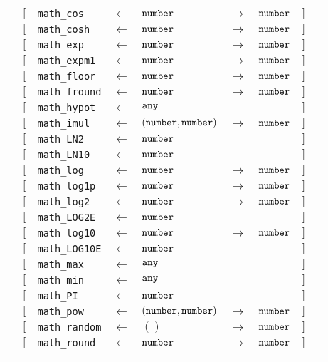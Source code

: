 \begin{tabular}[fragile]{lllllllll}
& $[$ & \texttt{math\_cos} & $\leftarrow$  & $\texttt{number}$ & $\rightarrow$ & $\texttt{number}$ & $]$ \\
& $[$ & \texttt{math\_cosh} & $\leftarrow$  & $\texttt{number}$ & $\rightarrow$ & $\texttt{number}$ & $]$ \\
& $[$ & \texttt{math\_exp} & $\leftarrow$  & $\texttt{number}$ & $\rightarrow$ & $\texttt{number}$ & $]$ \\
& $[$ & \texttt{math\_expm1} & $\leftarrow$  & $\texttt{number}$ & $\rightarrow$ & $\texttt{number}$ & $]$ \\
& $[$ & \texttt{math\_floor} & $\leftarrow$  & $\texttt{number}$ & $\rightarrow$ & $\texttt{number}$ & $]$ \\
& $[$ & \texttt{math\_fround} & $\leftarrow$  & $\texttt{number}$ & $\rightarrow$ & $\texttt{number}$ & $]$ \\
& $[$ & \texttt{math\_hypot} & $\leftarrow$  & $\texttt{any}$ & & & $]$ \\
& $[$ & \texttt{math\_imul} & $\leftarrow$  & $(\texttt{number}, \texttt{number})$ & $\rightarrow$ & $\texttt{number}$ & $]$ \\
& $[$ & \texttt{math\_LN2} & $\leftarrow$  & $\texttt{number}$ & & & $]$ \\
& $[$ & \texttt{math\_LN10} & $\leftarrow$  & $\texttt{number}$ & & & $]$ \\
& $[$ & \texttt{math\_log} & $\leftarrow$  & $\texttt{number}$ & $\rightarrow$ & $\texttt{number}$ & $]$ \\
& $[$ & \texttt{math\_log1p} & $\leftarrow$  & $\texttt{number}$ & $\rightarrow$ & $\texttt{number}$ & $]$ \\
& $[$ & \texttt{math\_log2} & $\leftarrow$  & $\texttt{number}$ & $\rightarrow$ & $\texttt{number}$ & $]$ \\
& $[$ & \texttt{math\_LOG2E} & $\leftarrow$  & $\texttt{number}$ & & & $]$ \\
& $[$ & \texttt{math\_log10} & $\leftarrow$  & $\texttt{number}$ & $\rightarrow$ & $\texttt{number}$ & $]$ \\
& $[$ & \texttt{math\_LOG10E} & $\leftarrow$  & $\texttt{number}$ & & & $]$ \\
& $[$ & \texttt{math\_max} & $\leftarrow$  & $\texttt{any}$ & & & $]$ \\
& $[$ & \texttt{math\_min} & $\leftarrow$  & $\texttt{any}$ & & & $]$ \\
& $[$ & \texttt{math\_PI} & $\leftarrow$  & $\texttt{number}$ & & & $]$ \\
& $[$ & \texttt{math\_pow} & $\leftarrow$  & $(\texttt{number}, \texttt{number})$ & $\rightarrow$ & $\texttt{number}$ & $]$ \\
& $[$ & \texttt{math\_random} & $\leftarrow$  & $()$ & $\rightarrow$ & $\texttt{number}$ & $]$ \\
& $[$ & \texttt{math\_round} & $\leftarrow$  & $\texttt{number}$ & $\rightarrow$ & $\texttt{number}$ & $]$ \\
& \end{tabular}

